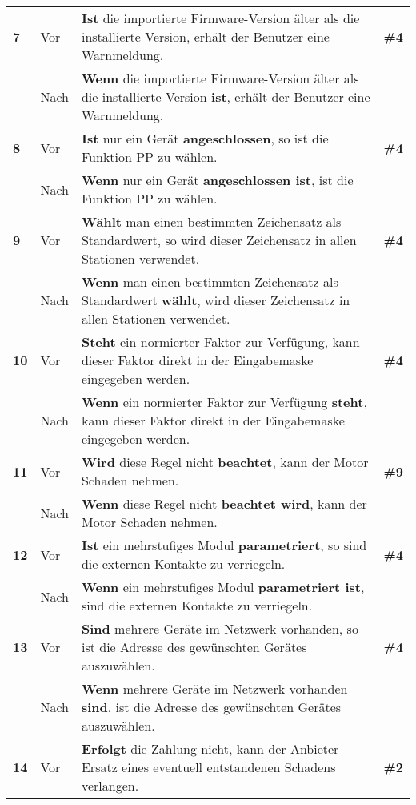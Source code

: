 \begin{longtable}{llp{}l}
\tablevspace
{ \textbf{7}} & Vor & \textbf{Ist} die importierte Firmware-Version älter als die installierte Version, erhält der Benutzer eine Warnmeldung. & \textbf{\#4}\\
& Nach & \textbf{Wenn} die importierte Firmware-Version älter als die installierte Version \textbf{ist}, erhält der Benutzer eine Warnmeldung. & \\
\tablevspace
{ \textbf{8}} & Vor & \textbf{Ist} nur ein Gerät \textbf{angeschlossen}, so ist die Funktion PP zu wählen. & \textbf{\#4}\\
& Nach & \textbf{Wenn} nur ein Gerät \textbf{angeschlossen ist}, ist die Funktion PP zu wählen. & \\
\tablevspace
{ \textbf{9}} & Vor & \textbf{Wählt} man einen bestimmten Zeichensatz als Standardwert, so wird dieser Zeichensatz in allen Stationen verwendet. & \textbf{\#4}\\
& Nach & \textbf{Wenn} man einen bestimmten Zeichensatz als Standardwert \textbf{wählt}, wird dieser Zeichensatz in allen Stationen verwendet. & \\
\tablevspace
{ \textbf{10}} & Vor & \textbf{Steht} ein normierter Faktor zur Verfügung, kann dieser Faktor direkt in der Eingabemaske eingegeben werden. & \textbf{\#4}\\
& Nach & \textbf{Wenn} ein normierter Faktor zur Verfügung \textbf{steht}, kann dieser Faktor direkt in der Eingabemaske eingegeben werden. & \\
\tablevspace
{ \textbf{11}} & Vor & \textbf{Wird} diese Regel nicht \textbf{beachtet}, kann der Motor Schaden nehmen. & \textbf{\#9}\\
& Nach & \textbf{Wenn} diese Regel nicht \textbf{beachtet wird}, kann der Motor Schaden nehmen. & \\
\tablevspace
{ \textbf{12}} & Vor & \textbf{Ist} ein mehrstufiges Modul \textbf{parametriert}, so sind die externen Kontakte zu verriegeln. & \textbf{\#4}\\
& Nach & \textbf{Wenn} ein mehrstufiges Modul \textbf{parametriert ist}, sind die externen Kontakte zu verriegeln. & \\
\tablevspace
{ \textbf{13}} & Vor & \textbf{Sind} mehrere Geräte im Netzwerk vorhanden, so ist die Adresse des gewünschten Gerätes auszuwählen. & \textbf{\#4}\\
& Nach & \textbf{Wenn} mehrere Geräte im Netzwerk vorhanden \textbf{sind}, ist die Adresse des gewünschten Gerätes auszuwählen. & \\
\tablevspace
{ \textbf{14}} & Vor & \textbf{Erfolgt} die Zahlung nicht, kann der Anbieter Ersatz eines eventuell entstandenen Schadens verlangen. & \textbf{\#2}\\

\end{longtable}
